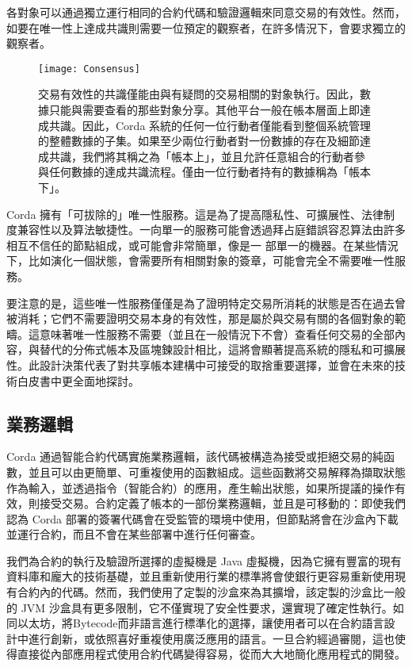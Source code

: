 \documentclass[UTF8]{ctexart}
\begin{document}
各對象可以通過獨立運行相同的合約代碼和驗證邏輯來同意交易的有效性。然而，如要在唯一性上達成共識則需要一位預定的觀察者，在許多情況下，會要求獨立的觀察者。

\begin{figure}[H]
    \texttt{[image: Consensus]}
    \caption{交易有效性的共識僅能由與有疑問的交易相關的對象執行。因此，數據只能與需要查看的那些對象分享。其他平台一般在帳本層面上即達成共識。因此，Corda 系統的任何一位行動者僅能看到整個系統管理的整體數據的子集。如果至少兩位行動者對一份數據的存在及細節達成共識，我們將其稱之為「帳本上」，並且允許任意組合的行動者參與任何數據的達成共識流程。僅由一位行動者持有的數據稱為「帳本下」。}
\end{figure}

Corda 擁有「可拔除的」唯一性服務。這是為了提高隱私性、可擴展性、法律制度兼容性\cite{EUC}以及算法敏捷性。一向單一的服務可能會透過拜占庭錯誤容忍算法由許多相互不信任的節點組成，或可能會非常簡單，像是一 部單一的機器。在某些情況下，比如演化一個狀態，會需要所有相關對象的簽章，可能會完全不需要唯一性服務。 

要注意的是，這些唯一性服務僅僅是為了證明特定交易所消耗的狀態是否在過去曾被消耗；它們不需要證明交易本身的有效性，那是屬於與交易有關的各個對象的範疇。這意味著唯一性服務不需要（並且在一般情況下不會）查看任何交易的全部內容，與替代的分佈式帳本及區塊鍊設計相比，這將會顯著提高系統的隱私和可擴展性。此設計決策代表了對共享帳本建構中可接受的取捨重要選擇，並會在未來的技術白皮書中更全面地探討。

\subsection{業務邏輯}
Corda 通過智能合約代碼實施業務邏輯，該代碼被構造為接受或拒絕交易的純函數，並且可以由更簡單、可重複使用的函數組成。這些函數將交易解釋為擷取狀態作為輸入，並透過指令（智能合約）的應用，產生輸出狀態，如果所提議的操作有效，則接受交易。合約定義了帳本的一部份業務邏輯，並且是可移動的：即使我們認為 Corda 部署的簽署代碼會在受監管的環境中使用，但節點將會在沙盒內下載並運行合約，而且不會在某些部署中進行任何審查。 

我們為合約的執行及驗證所選擇的虛擬機是 Java 虛擬機\cite{JVM}，因為它擁有豐富的現有資料庫和龐大的技術基礎，並且重新使用行業的標準將會使銀行更容易重新使用現有合約內的代碼。然而，我們使用了定製的沙盒來為其擴增，該定製的沙盒比一般的 JVM 沙盒具有更多限制，它不僅實現了安全性要求，還實現了確定性執行。如同以太坊\cite{Ethereum}，將Bytecode而非語言進行標準化的選擇，讓使用者可以在合約語言設計中進行創新，或依照喜好重複使用廣泛應用的語言。一旦合約經過審閱，這也使得直接從內部應用程式使用合約代碼變得容易，從而大大地簡化應用程式的開發。
\end{document}
